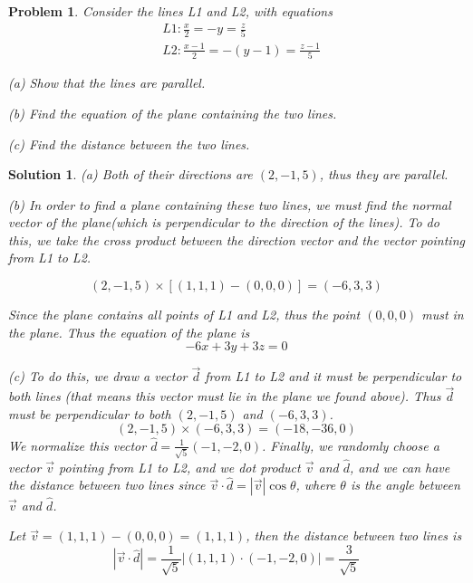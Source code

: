 \documentclass{article}
\newtheorem{problem}{Problem}
\newtheorem*{solution}{Solution}
\begin{document}
\begin{problem}
	Consider the lines L1 and L2, with equations 
	\begin{align*}
	&L1: \frac{x}{2} = -y = \frac{z}{5}\\
	&L2: \frac{x-1}{2} = -(y-1) = \frac{z-1}{5}
	\end{align*}
	
	(a) Show that the lines are parallel.
	
	(b) Find the equation of the plane containing the two lines.
	
	(c) Find the distance between the two lines.
\end{problem}
\begin{solution}
	(a) Both of their directions are $(2,-1,5)$, thus they are parallel.
	
	(b) In order to find a plane containing these two lines, we must find the normal vector of the plane(which is perpendicular to the direction of the lines). To do this, we take the cross product between the direction vector and the vector pointing from L1 to L2.
	
	\[ (2,-1,5) \times [(1,1,1)-(0,0,0)] = (-6,3,3) \]
	
	Since the plane contains all points of L1 and L2, thus the point $(0,0,0)$ must in the plane. Thus the equation of the plane is
	 \[ -6x+3y+3z = 0 \]
	 
	 (c) To do this, we draw a vector $\vec{d}$ from L1 to L2 and it must be perpendicular to both lines (that means this vector must lie in the plane we found above). Thus $\vec{d}$ must be perpendicular to both $(2,-1,5)$ and $(-6,3,3)$.
	 \[ (2,-1,5) \times (-6,3,3) = (-18,-36,0) \]
	 We normalize this vector $\hat{d} = \frac{1}{\sqrt{5}}(-1,-2,0)$. 
	 Finally, we randomly choose a vector $\vec{v}$ pointing from L1 to L2, and we dot product $\vec{v}$ and $\hat{d}$, and we can have the distance between two lines since $\vec{v}\cdot\hat{d} = |\vec{v}|\cos\theta$, where $\theta$ is the angle between $\vec{v}$ and $\hat{d}$.
	 
	 Let $\vec{v} = (1,1,1)-(0,0,0) = (1,1,1)$, then the distance between two lines is
	 \[ |\vec{v}\cdot\hat{d}| = \frac{1}{\sqrt{5}}|(1,1,1)\cdot(-1,-2,0)| = \frac{3}{\sqrt{5}} \]
\end{solution}
\end{document}
